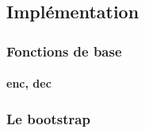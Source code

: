 \subsection{Implémentation}

\begin{frame}
\frametitle{Fonctions de base}
\framesubtitle{enc, dec}
\end{frame}

\begin{frame}
\frametitle{Le bootstrap}
\end{frame}